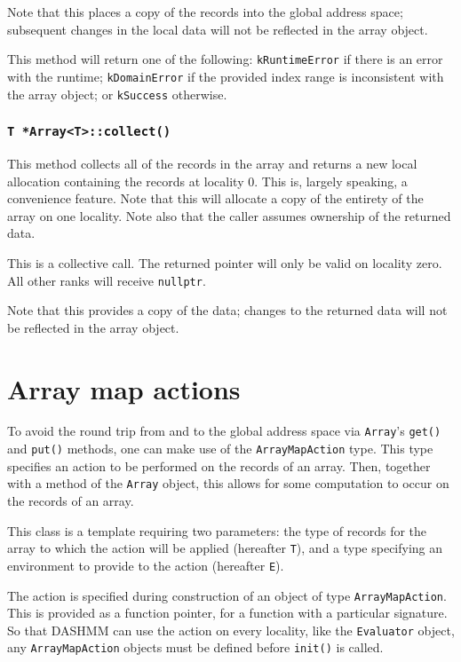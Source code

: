 Note that this places a copy of the records into the global address space;
subsequent changes in the local data will not be reflected in the array object.

This method will return one of the following: \texttt{kRuntimeError} if there
is an error with the runtime; \texttt{kDomainError} if the provided index
range is inconsistent with the array object; or \texttt{kSuccess} otherwise.

\subsubsection{\texttt{T *Array<T>::collect()}}

This method collects all of the records in the array and returns a new local
allocation containing the records at locality 0. This is, largely speaking, a
convenience feature. Note that this will allocate a copy of the entirety of the
array on one locality. Note also that the caller assumes ownership of the
returned data.

This is a collective call. The returned pointer will only be valid on locality
zero. All other ranks will receive \texttt{nullptr}.

Note that this provides a copy of the data; changes to the returned data will
not be reflected in the array object.

\section{Array map actions}

To avoid the round trip from and to the global address space via
\texttt{Array}'s \texttt{get()} and \texttt{put()} methods, one can make use
of the \texttt{ArrayMapAction} type. This type specifies an action to be
performed on the records of an array. Then, together with a method of the
\texttt{Array} object, this allows for some computation to occur on the
records of an array.

This class is a template requiring two parameters: the type of records for
the array to which the action will be applied (hereafter \texttt{T}), and a
type specifying an environment to provide to the action (hereafter \texttt{E}).

The action is specified during construction of an object of type
\texttt{ArrayMapAction}. This is provided as a function pointer, for a function
with a particular signature. So that DASHMM can use the action on every
locality, like the \texttt{Evaluator} object, any \texttt{ArrayMapAction}
objects must be defined before \texttt{init()} is called.

